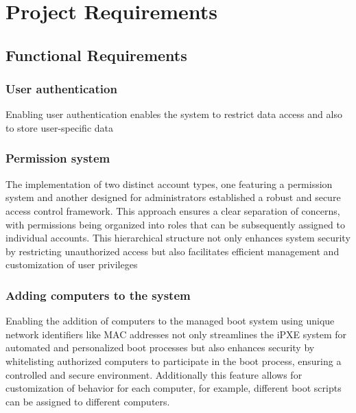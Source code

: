 \documentclass[../main.tex]{subfiles}
\begin{document}
\section{Project Requirements}

\subsection{Functional Requirements}
\label{subsec:functional-requirements}

\subsubsection{User authentication}
\label{req-f:authentication}

Enabling user authentication enables the system to restrict data access and also to store user-specific data

\subsubsection{Permission system}
\label{req-f:permission-system}

The implementation of two distinct account types, one featuring a permission system and another designed for administrators established a robust and secure access control framework.
This approach ensures a clear separation of concerns, with permissions being organized into roles that can be subsequently assigned to individual accounts.
This hierarchical structure not only enhances system security by restricting unauthorized access but also facilitates efficient management and customization of user privileges


\subsubsection{Adding computers to the system}
\label{req-f:add-computer}

Enabling the addition of computers to the managed boot system using unique network identifiers like MAC addresses not only streamlines the iPXE system for automated and personalized boot processes but
also enhances security by whitelisting authorized computers to participate in the boot process, ensuring a controlled and secure environment.
Additionally this feature allows for customization of behavior for each computer, for example, different boot scripts can be assigned to different computers.
\end{document}
